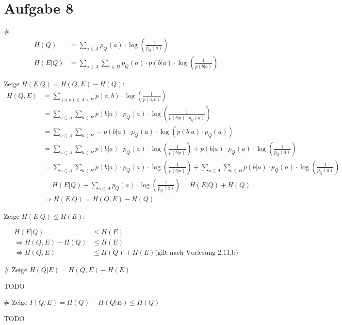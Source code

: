 \section*{Aufgabe 8}
\begin{myList}
#
\begin{align*}
	H(Q) &= \sum\limits_{a \in A} p_Q(a) \cdot \log \left( \frac{1}{p_Q(a)} \right) \\
	H(E|Q) &= \sum\limits_{a \in A} \sum\limits_{b \in B} p_Q(a) \cdot p(b|a) \cdot \log \left( \frac{1}{p(b|a)}\right) 
\end{align*}

Zeige $H(E|Q) = H(Q,E) - H(Q)$:
\begin{align*}
	H(Q,E) &= \sum\limits_{(a,b) \in A\times B} p(a,b) \cdot \log\left(\frac{1}{p(a,b)}\right) \\
	&= \sum\limits_{a \in A} \sum\limits_{b \in B} p(b|a) \cdot p_Q(a) \cdot \log \left( \frac{1}{p(b|a) \cdot p_Q(a)} \right) \\
	&= \sum\limits_{a \in A} \sum\limits_{b \in B} -p(b|a) \cdot p_Q(a) \cdot \log \left(p(b|a) \cdot p_Q(a) \right) \\
	&= \sum\limits_{a \in A} \sum\limits_{b \in B} p(b|a) \cdot p_Q(a) \cdot \log \left(\frac{1}{p(b|a)} \right) + p(b|a) \cdot p_Q(a) \cdot \log \left(\frac{1}{p_Q(a)} \right) \\
	&= \sum\limits_{a \in A} \sum\limits_{b \in B} p(b|a) \cdot p_Q(a) \cdot \log \left(\frac{1}{p(b|a)} \right) + \sum\limits_{a \in A} \sum\limits_{b \in B} p(b|a) \cdot p_Q(a) \cdot \log \left(\frac{1}{p_Q(a)} \right) \\
	&= H(E|Q) + \sum\limits_{a \in A}  p_Q(a) \cdot \log \left(\frac{1}{p_Q(a)} \right) = H(E|Q) + H(Q)\\
	&\Rightarrow H(E|Q) = H(Q,E) - H(Q)
\end{align*}

Zeige $H(E|Q) \leq H(E)$:

\begin{align*}
	 H(E|Q) &\leq H(E) \\
	\Leftrightarrow H(Q,E) - H(Q) &\leq H(E) \\
	\Leftrightarrow H(Q,E) &\leq H(Q) + H(E) \text{(gilt nach Vorlesung 2.11.b)}
\end{align*}

#
Zeige $H(Q|E) = H(Q,E) - H(E)$

TODO

#
Zeige $I(Q,E) = H(Q) - H(Q|E) \leq H(Q)$

TODO

\end{myList}

